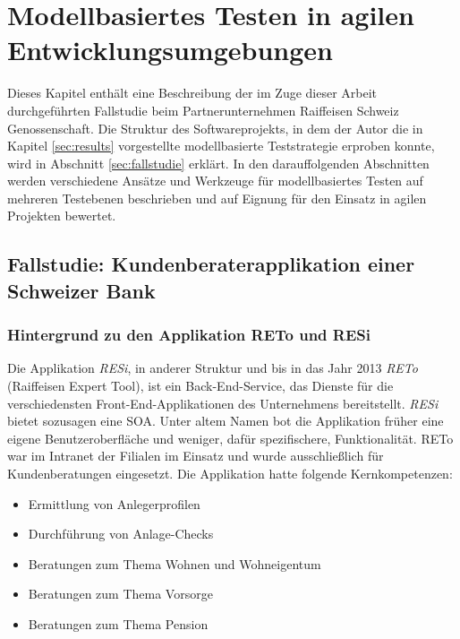 \chapter{Modellbasiertes Testen in agilen Entwicklungsumgebungen}
\label{sec:problemdescription}

Dieses Kapitel enthält eine Beschreibung der im Zuge dieser Arbeit durchgeführten Fallstudie beim Partnerunternehmen Raiffeisen Schweiz Genossenschaft. Die Struktur des Softwareprojekts, in dem der Autor die in Kapitel \ref{sec:results}  vorgestellte modellbasierte Teststrategie erproben konnte, wird in Abschnitt \ref{sec:fallstudie} erklärt. In den darauffolgenden Abschnitten werden verschiedene Ansätze und Werkzeuge für modellbasiertes Testen auf mehreren Testebenen beschrieben und auf Eignung für den Einsatz in agilen Projekten bewertet.

\section{Fallstudie: Kundenberaterapplikation einer Schweizer Bank}
\label{sec:fallstudie}
\subsection{Hintergrund zu den Applikation RETo und RESi}
Die Applikation \textit{RESi}, in anderer Struktur und bis in das Jahr 2013 \textit{RETo} (Raiffeisen Expert Tool), ist ein \Gls{Back-End}-Service, das Dienste für die verschiedensten \Gls{Front-End}-Applikationen des Unternehmens bereitstellt. \textit{RESi} bietet sozusagen eine \Gls{SOA}. Unter altem Namen bot die Applikation früher eine eigene Benutzeroberfläche und weniger, dafür spezifischere, Funktionalität. RETo war im Intranet der Filialen im Einsatz und wurde ausschließlich für Kundenberatungen eingesetzt. Die Applikation hatte folgende Kernkompetenzen:

\begin{itemize}
\item Ermittlung von Anlegerprofilen
\item Durchführung von Anlage-Checks
\item Beratungen zum Thema Wohnen und Wohneigentum
\item Beratungen zum Thema Vorsorge
\item Beratungen zum Thema Pension
\end{itemize}

